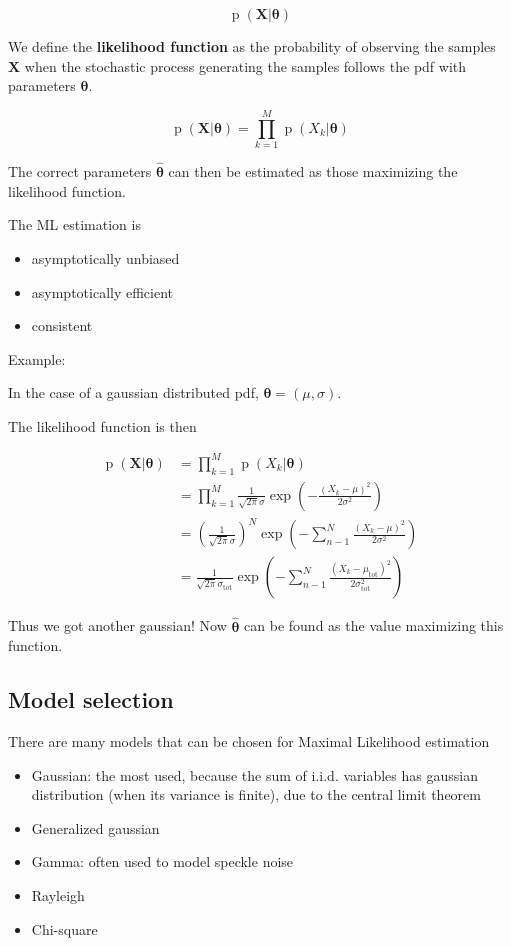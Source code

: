 \documentclass[oneside,onecolumn]{report}
\DeclareMathOperator*{\pdf}{p}
\begin{document}
$$ \pdf(\bm X | \bm \theta) $$

We define the \textbf{likelihood function} as the probability of observing the samples $\bm X$ when the stochastic process generating the samples follows the pdf with parameters $\bm \theta$.

$$ \pdf(\bm X | \bm \theta) = \prod_{k = 1}^M \pdf(X_k | \bm \theta) $$

The correct parameters $\bm{\widehat \theta}$ can then be estimated as those maximizing the likelihood function.

The ML estimation is
\begin{itemize}
    \item asymptotically unbiased
    \item asymptotically efficient
    \item consistent
\end{itemize}


Example:

In the case of a gaussian distributed pdf, $\bm \theta = (\mu, \sigma)$.

The likelihood function is then

\begin{align*}
    \pdf(\bm X| \bm \theta)
    &= \prod_{k = 1}^M \pdf(X_k | \bm \theta) \\
    &= \prod_{k = 1}^M \frac{1}{\sqrt{2 \pi} \sigma} \exp( -\frac{(X_k - \mu)^2}{2 \sigma^2}) \\
    &= \left(\frac{1}{\sqrt{2 \pi} \sigma}\right)^N \exp( - \sum_{n -1}^N \frac{(X_k - \mu)^2}{2 \sigma^2}) \\
    &=  \frac{1}{\sqrt{2 \pi} \sigma_\text{tot}} \exp( - \sum_{n -1}^N \frac{(X_k - \mu_\text{tot})^2}{2 \sigma_\text {tot}^2} )
\end{align*}

Thus we got another gaussian! Now $\bm{\widehat \theta}$ can be found as the value maximizing this function.

\subsection{Model selection}

There are many models that can be chosen for Maximal Likelihood estimation
\begin{itemize}
    \item Gaussian: the most used, because the sum of i.i.d. variables has gaussian distribution (when its variance is finite), due to the central limit theorem
    \item Generalized gaussian
    \item Gamma: often used to model speckle noise
    \item Rayleigh
    \item Chi-square
\end{itemize}
\end{document}
